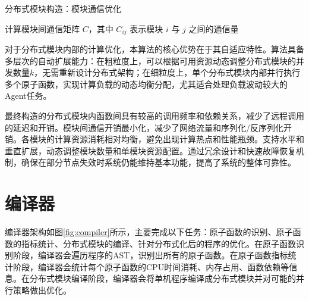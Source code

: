 \begin{algorithm}[htbp]
	\caption{分布式模块构造：模块通信优化}
	\label{communication_optimization}
	\SetAlgoLined
	\DontPrintSemicolon
	
	计算模块间通信矩阵 $C$，其中 $C_{ij}$ 表示模块 $i$ 与 $j$ 之间的通信量\;
	\;
\end{algorithm}


对于分布式模块内部的计算优化，本算法的核心优势在于其自适应特性。算法具备多层次的自动扩展能力：在粗粒度上，可以根据可用资源动态调整分布式模块的并发数量$k$，无需重新设计分布式架构；在细粒度上，单个分布式模块内部并行执行多个原子函数，实现计算负载的动态均衡分配，尤其适合处理负载波动较大的Agent任务。

最终构造的分布式模块内函数间具有较高的调用频率和依赖关系，减少了远程调用的延迟和开销。模块间通信开销最小化，减少了网络流量和序列化/反序列化开销。各模块的计算资源消耗相对均衡，避免出现计算热点和性能瓶颈。支持水平和垂直扩展，动态调整模块数量和单模块资源配置。通过冗余设计和快速故障恢复机制，确保在部分节点失效时系统仍能维持基本功能，提高了系统的整体可靠性。

\section{编译器}
\label{sec:compiler}
编译器架构如图\ref{fig:compiler}所示，主要完成以下任务：原子函数的识别、原子函数的指标统计、分布式模块的编译、针对分布式化后的程序的优化。在原子函数识别阶段，编译器会遍历程序的AST，识别出所有的原子函数。在原子函数指标统计阶段，编译器会统计每个原子函数的CPU时间消耗、内存占用、函数依赖等信息。在分布式模块编译阶段，编译器会将单机程序编译成分布式模块并对可能的并行策略做出优化。

